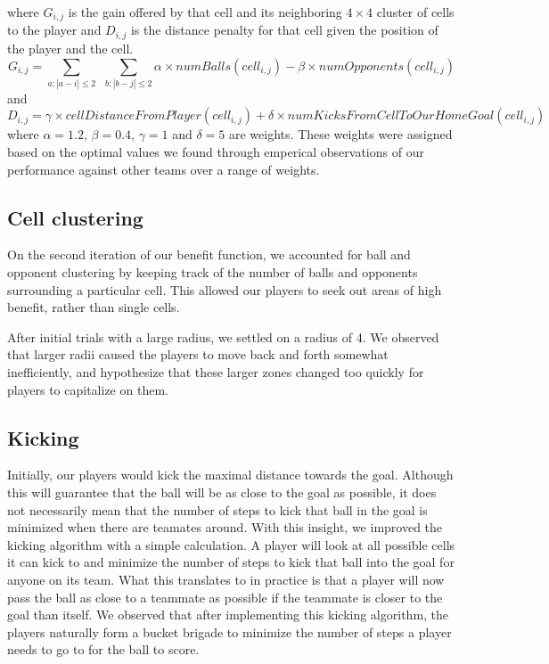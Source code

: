 \documentclass[
10pt, %
letterpaper, %
oneside, %
headinclude,footinclude, %
english
]{article}
\begin{document}
where $G_{i, j}$ is the gain offered by that cell and its neighboring $4 \times 4$ cluster of cells to the player and $D_{i, j}$ is the distance penalty for that cell given the position of the player and the cell. $$G_{i, j} = \sum_{a : |a - i| \leq 2}\ \ \sum_{b : |b - j| \leq 2} \alpha \times numBalls(cell_{i, j}) - \beta \times numOpponents(cell_{i,j}) $$ and $$D_{i, j} = \gamma \times cellDistanceFromPlayer(cell_{i,j}) + \delta \times numKicksFromCellToOurHomeGoal(cell_{i, j})$$ where $\alpha = 1.2$, $\beta = 0.4$, $\gamma = 1$ and $\delta = 5$ are weights. These weights were assigned based on the optimal values we found through emperical observations of our performance against other teams over a range of weights.

\subsection{Cell clustering}
On the second iteration of our benefit function, we accounted for ball and opponent clustering by keeping track of the number of balls and opponents surrounding a particular cell. This allowed our players to seek out areas of high benefit, rather than single cells.

After initial trials with a large radius, we settled on a radius of 4. We observed that larger radii caused the players to move back and forth somewhat inefficiently, and hypothesize that these larger zones changed too quickly for players to capitalize on them.

\subsection{Kicking}
Initially, our players would kick the maximal distance towards the goal. Although this will guarantee that the ball will be as close to the goal as possible, it does not necessarily mean that the number of steps to kick that ball in the goal is minimized when there are teamates around. With this insight, we improved the kicking algorithm with a simple calculation. A player will look at all possible cells it can kick to and minimize the number of steps to kick that ball into the goal for anyone on its team. What this translates to in practice is that a player will now pass the ball as close to a teammate as possible if the teammate is closer to the goal than itself. We observed that after implementing this kicking algorithm, the players naturally form a bucket brigade to minimize the number of steps a player needs to go to for the ball to score.
\end{document}
